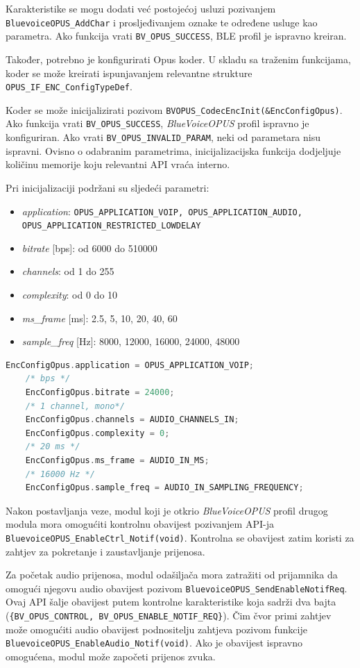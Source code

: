 Karakteristike se mogu dodati već postojećoj usluzi pozivanjem \lstinline|BluevoiceOPUS_AddChar| i prosljeđivanjem oznake te određene usluge kao parametra. Ako funkcija vrati \lstinline|BV_OPUS_SUCCESS|, BLE profil je ispravno kreiran.

Također, potrebno je konfigurirati Opus koder. U skladu sa traženim funkcijama, koder se može kreirati ispunjavanjem relevantne strukture \lstinline|OPUS_IF_ENC_ConfigTypeDef|.

Koder se može inicijalizirati pozivom \lstinline|BVOPUS_CodecEncInit(&EncConfigOpus)|. Ako funkcija vrati \lstinline|BV_OPUS_SUCCESS|, \textit{BlueVoiceOPUS} profil ispravno je konfiguriran. Ako vrati \lstinline|BV_OPUS_INVALID_PARAM|, neki od parametara nisu ispravni. Ovisno o odabranim parametrima, inicijalizacijska funkcija dodjeljuje količinu memorije koju relevantni API vraća interno. 

Pri inicijalizaciji podržani su sljedeći parametri:
\begin{itemize}
	\item \textit{application}: \lstinline|OPUS_APPLICATION_VOIP, OPUS_APPLICATION_AUDIO, OPUS_APPLICATION_RESTRICTED_LOWDELAY|
	\item \textit{bitrate} [bps]: od 6000 do 510000
	\item \textit{channels}: od 1 do 255
	\item \textit{complexity}: od 0 do 10
	\item \textit{ms\_frame} [ms]: 2.5, 5, 10, 20, 40, 60
	\item \textit{sample\_freq} [Hz]: 8000, 12000, 16000, 24000, 48000
\end{itemize}

\begin{lstlisting}[caption={Parametri za Opus koder}, language=c]
	EncConfigOpus.application = OPUS_APPLICATION_VOIP;
	/* bps */
	EncConfigOpus.bitrate = 24000; 
	/* 1 channel, mono*/
	EncConfigOpus.channels = AUDIO_CHANNELS_IN; 
	EncConfigOpus.complexity = 0;
	/* 20 ms */
	EncConfigOpus.ms_frame = AUDIO_IN_MS; 
	/* 16000 Hz */
	EncConfigOpus.sample_freq = AUDIO_IN_SAMPLING_FREQUENCY; 
\end{lstlisting}

Nakon postavljanja veze, modul koji je otkrio \textit{BlueVoiceOPUS} profil drugog modula mora omogućiti kontrolnu obavijest pozivanjem API-ja \lstinline|BluevoiceOPUS_EnableCtrl_Notif(void)|. Kontrolna se obavijest zatim koristi za zahtjev za pokretanje i zaustavljanje prijenosa.

Za početak audio prijenosa, modul odašiljača mora zatražiti od prijamnika da omogući njegovu audio obavijest pozivom \lstinline|BluevoiceOPUS_SendEnableNotifReq|. Ovaj API šalje obavijest putem kontrolne karakteristike koja sadrži dva bajta (\lstinline|{BV_OPUS_CONTROL, BV_OPUS_ENABLE_NOTIF_REQ}|). Čim čvor primi zahtjev može omogućiti audio obavijest podnositelju zahtjeva pozivom funkcije \lstinline|BluevoiceOPUS_EnableAudio_Notif(void)|. Ako je obavijest ispravno omogućena, modul može započeti prijenos zvuka.

